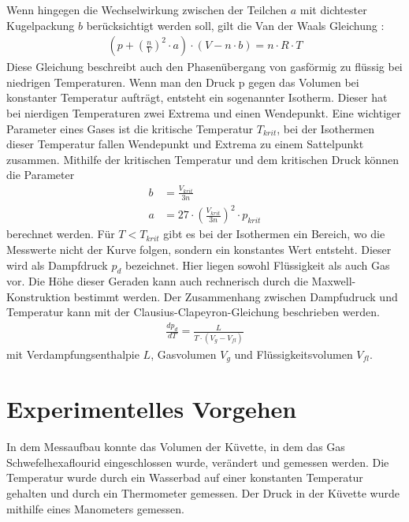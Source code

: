 \documentclass[11pt, a4paper]{article}
\begin{document}
    Wenn hingegen die Wechselwirkung zwischen der Teilchen $a$ mit dichtester Kugelpackung $b$
    berücksichtigt werden soll, gilt die Van der Waals Gleichung \cite[(4)]{ZUS}:
    \begin{align}
        \left(p+\left(\frac{n}{V}\right)^2 \cdot a\right) \cdot \left(V-n \cdot b \right) = n \cdot R \cdot T
    \end{align}
    Diese Gleichung beschreibt auch den Phasenübergang von gasförmig zu flüssig bei niedrigen Temperaturen.
    Wenn man den Druck p gegen das Volumen bei konstanter Temperatur aufträgt, entsteht ein sogenannter Isotherm.
    Dieser hat bei nierdigen Temperaturen zwei Extrema und einen Wendepunkt. 
    Eine wichtiger Parameter eines Gases ist die kritische Temperatur $T_{krit}$, bei der Isothermen dieser Temperatur
    fallen Wendepunkt und Extrema zu einem Sattelpunkt zusammen.
    Mithilfe der kritischen Temperatur und dem kritischen Druck können die Parameter
    \begin{align}
        b &= \frac{V_{krit}}{3n} \label{eq:b}\\
        a &= 27 \cdot \left(\frac{V_{krit}}{3n}\right)^2 \cdot p_{krit} \label{eq:a}
    \end{align} 
    berechnet werden.
    Für $T < T_{krit}$ gibt es bei der Isothermen ein Bereich,
    wo die Messwerte nicht der Kurve folgen, sondern ein konstantes Wert entsteht. Dieser wird als Dampfdruck $p_{d}$
    bezeichnet. Hier liegen sowohl Flüssigkeit als auch Gas vor. Die Höhe dieser Geraden kann auch rechnerisch durch die Maxwell-Konstruktion bestimmt werden.
    Der Zusammenhang zwischen Dampfudruck und Temperatur kann mit der Clausius-Clapeyron-Gleichung \cite[(9)]{ZUS} beschrieben werden.
    \begin{align}
        \frac{d p_d}{d T} = \frac{L}{T \cdot\left(V_g - V_{fl}\right)} \label{eq:delta}
    \end{align}
    mit Verdampfungsenthalpie $L$, Gasvolumen $V_g$ und Flüssigkeitsvolumen $V_{fl}$.

    \section{Experimentelles Vorgehen}
    In dem Messaufbau konnte das Volumen der Küvette, in dem das Gas Schwefelhexaflourid eingeschlossen wurde, verändert und gemessen werden.
    Die Temperatur wurde durch ein Wasserbad auf einer konstanten Temperatur gehalten und durch ein Thermometer gemessen. 
    Der Druck in der Küvette wurde mithilfe eines Manometers gemessen.
\end{document}
